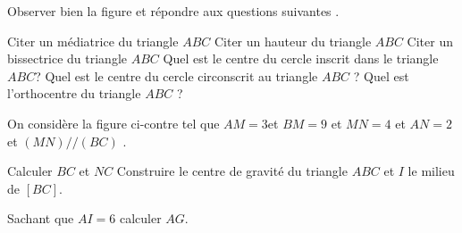\documentclass[a4paper,addpoints,12pt]{exam}
\begin{document}
\devoir[ds=true,num=3 ,niv=2 ,date=12/01/2023,prv=false ]

\begin{exo}[6]

Observer bien la figure et répondre aux questions suivantes .
\begin{questions}
\question[1] Citer un médiatrice du triangle $ABC$
\anserline[1]
\question[1] Citer un hauteur du triangle $ABC$
\anserline[1]
\question[1] Citer un bissectrice du triangle $ABC$
\anserline[1]
\question[1] Quel est le centre du cercle inscrit dans le triangle $ABC$?
\anserline[1]
\question[1] Quel est le centre du cercle circonscrit au triangle $ABC$ ?
\anserline[1]
\question[1] Quel est l'orthocentre du triangle $ABC$ ?
\anserline[1]
\end{questions}
\end{exo}

\begin{exo}[8]
On considère la figure ci-contre tel que $AM=3$\newline et $BM=9$ et $MN=4$ et $AN=2$ et $(MN)//(BC)$ . 
\begin{questions}
\begin{minipage}{0.6\linewidth}
\question[4] Calculer $BC$ et $NC$
\anserline[4]
\question[2] Construire le centre de gravité du triangle $ABC$ et $I$ le milieu de $[BC]$.
\end{minipage}
\begin{minipage}{0.4\linewidth}
\end{minipage}
\question[2] Sachant que  $AI=6$ calculer $AG$.
\end{questions}
\anserline[2]
\end{exo}
\end{document}
